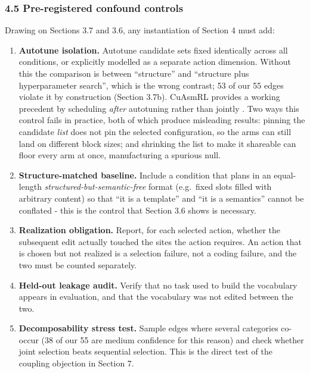 \documentclass[
  11pt,
]{article}
\providecommand{\tightlist}{%
  \setlength{\itemsep}{0pt}\setlength{\parskip}{0pt}}
\begin{document}
\hypertarget{pre-registered-confound-controls}{%
\subsubsection{4.5 Pre-registered confound controls}\label{pre-registered-confound-controls}}

Drawing on Sections 3.7 and 3.6, any instantiation of Section 4 must add:

\begin{enumerate}
\def\labelenumi{\arabic{enumi}.}
\tightlist
\item
  \textbf{Autotune isolation.} Autotune candidate sets fixed identically across all conditions, or explicitly modelled as a separate action dimension. Without this the comparison is between ``structure'' and ``structure plus hyperparameter search'', which is the wrong contrast; 53 of our 55 edges violate it by construction (Section 3.7b). CuAsmRL provides a working precedent by scheduling \emph{after} autotuning rather than jointly \cite{cuasmrl30}. Two ways this control fails in practice, both of which produce misleading results: pinning the candidate \emph{list} does not pin the selected configuration, so the arms can still land on different block sizes; and shrinking the list to make it shareable can floor every arm at once, manufacturing a spurious null.
\item
  \textbf{Structure-matched baseline.} Include a condition that plans in an equal-length \emph{structured-but-semantic-free} format (e.g.~fixed slots filled with arbitrary content) so that ``it is a template'' and ``it is a semantics'' cannot be conflated - this is the control that Section 3.6 shows is necessary.
\item
  \textbf{Realization obligation.} Report, for each selected action, whether the subsequent edit actually touched the sites the action requires. An action that is chosen but not realized is a selection failure, not a coding failure, and the two must be counted separately.
\item
  \textbf{Held-out leakage audit.} Verify that no task used to build the vocabulary appears in evaluation, and that the vocabulary was not edited between the two.
\item
  \textbf{Decomposability stress test.} Sample edges where several categories co-occur (38 of our 55 are medium confidence for this reason) and check whether joint selection beats sequential selection. This is the direct test of the coupling objection in Section 7.
\end{enumerate}
\end{document}
